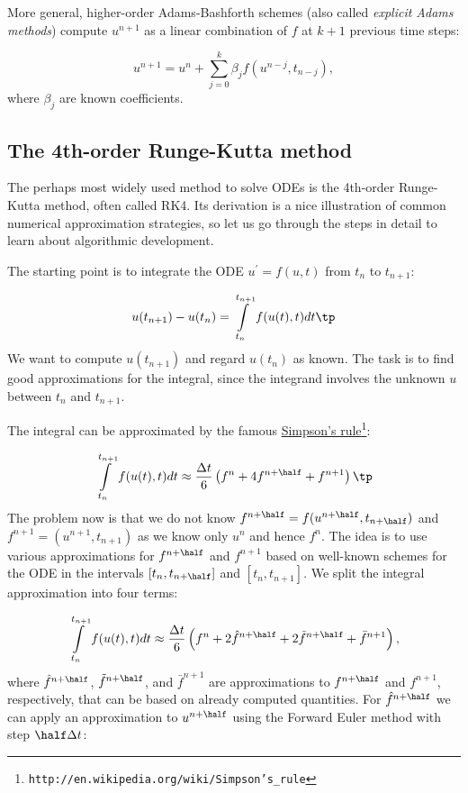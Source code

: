 \documentclass[graybox,sectrefs,envcountresetchap,open=right,final]{svmonodo}
\begin{document}
More general, higher-order Adams-Bashforth schemes (also called
\emph{explicit Adams methods}) compute $u^{n+1}$ as a linear combination
of $f$ at $k+1$ previous time steps:

\[ u^{n+1} = u^n + \sum_{j=0}^k \beta_jf(u^{n-j},t_{n-j}),\]
where $\beta_j$ are known coefficients.


\subsection{The 4th-order Runge-Kutta method}
\label{decay:fd2:RK4}


The perhaps most widely used method to solve ODEs is the 4th-order
Runge-Kutta method, often called RK4.
Its derivation is a nice illustration of common
numerical approximation strategies, so let us go through the
steps in detail to learn about algorithmic development.

The starting point is to integrate the ODE
$u^{\prime}=f(u,t)$ from $t_n$ to $t_{n+1}$:

\[ u(t_{n+1}) - u(t_n) = \int\limits_{t_{n}}^{t_{n+1}} f(u(t),t)dt\tp \]
We want to compute $u(t_{n+1})$ and regard $u(t_n)$ as known.
The task is to find good approximations for the integral, since the
integrand involves the unknown $u$ between $t_n$ and $t_{n+1}$.

The integral can be approximated by the famous
\href{{http://en.wikipedia.org/wiki/Simpson's_rule}}{Simpson's rule}\footnote{\texttt{http://en.wikipedia.org/wiki/Simpson's\_rule}}:

\[ \int\limits_{t_{n}}^{t_{n+1}} f(u(t),t)dt
\approx \frac{\Delta t}{6}\left( f^n + 4f^{n+\half} + f^{n+1}\right)\tp\]
The problem now is that we do not know $f^{n+\half}=f(u^{n+\half},t_{n+\half})$
and $f^{n+1}=(u^{n+1},t_{n+1})$ as we know only $u^n$ and hence $f^n$.
The idea is to use various approximations for $f^{n+\half}$ and
$f^{n+1}$ based on well-known schemes for the ODE in the
intervals $[t_n,t_{n+\half}]$ and $[t_n, t_{n+1}]$.
We split the integral approximation into four terms:

\[ \int\limits_{t_{n}}^{t_{n+1}} f(u(t),t)dt
\approx \frac{\Delta t}{6}\left( f^n + 2\hat{f}^{n+\half}
+ 2\tilde{f}^{n+\half} + \bar{f}^{n+1}\right),\]
where $\hat{f}^{n+\half}$, $\tilde{f}^{n+\half}$, and $\bar{f}^{n+1}$
are approximations to $f^{n+\half}$ and
$f^{n+1}$, respectively, that can be based on already computed quantities.
For $\hat{f}^{n+\half}$ we can apply
an approximation to $u^{n+\half}$ using the Forward Euler
method with step $\half\Delta t$:
\end{document}
